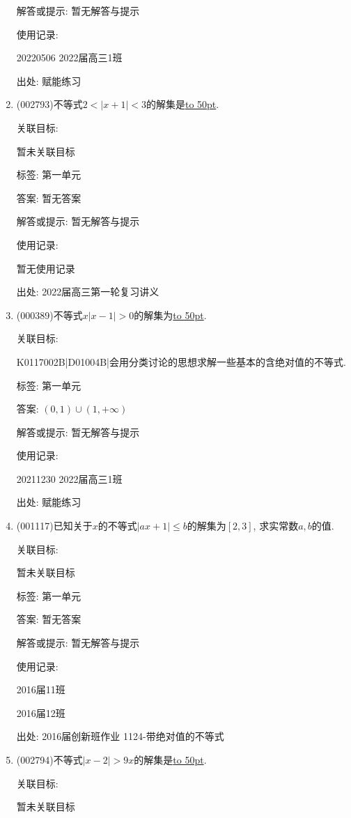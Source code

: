 \documentclass[10pt,a4paper]{article}
\newcommand{\blank}[1]{\underline{\hbox to #1pt{}}}
\begin{document}
\begin{enumerate}[1.]
解答或提示: 暂无解答与提示

使用记录:

20220506	2022届高三1班	


出处: 赋能练习
\item { (002793)}不等式$2<|x+1|<3$的解集是\blank{50}.


关联目标:

暂未关联目标



标签: 第一单元

答案: 暂无答案

解答或提示: 暂无解答与提示

使用记录:

暂无使用记录


出处: 2022届高三第一轮复习讲义
\item { (000389)}不等式$x|x-1|>0$的解集为\blank{50}.


关联目标:

K0117002B|D01004B|会用分类讨论的思想求解一些基本的含绝对值的不等式.



标签: 第一单元

答案: $(0,1)\cup (1,+\infty)$

解答或提示: 暂无解答与提示

使用记录:

20211230	2022届高三1班	


出处: 赋能练习
\item { (001117)}已知关于$x$的不等式$|ax+1|\leq b$的解集为$[2,3]$, 求实常数$a,b$的值.


关联目标:

暂未关联目标



标签: 第一单元

答案: 暂无答案

解答或提示: 暂无解答与提示

使用记录:

2016届11班	

2016届12班	


出处: 2016届创新班作业	1124-带绝对值的不等式
\item { (002794)}不等式$|x-2|>9x$的解集是\blank{50}.


关联目标:

暂未关联目标




\end{enumerate}
\end{document}
